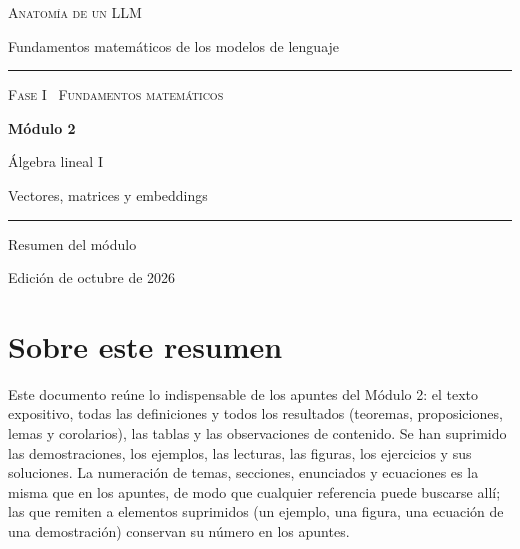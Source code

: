 \documentclass[11pt,a4paper,twoside,openany]{book}
\begin{document}
\frontmatter
\begin{titlepage}
\centering
\vspace*{2.5cm}
{\large\scshape Anatomía de un LLM}\par
\vspace{0.4cm}
{\normalsize Fundamentos matemáticos de los modelos de lenguaje}\par
\vspace{2.2cm}
\rule{\textwidth}{0.8pt}\par\vspace{0.5cm}
{\small\scshape Fase I \textperiodcentered\ Fundamentos matemáticos}\par\vspace{0.3cm}
{\Huge\bfseries Módulo 2\par}\vspace{0.3cm}
{\LARGE Álgebra lineal I\par}
\vspace{0.2cm}
{\large Vectores, matrices y embeddings\par}
\vspace{0.5cm}\rule{\textwidth}{0.4pt}\par
\vspace{1.6cm}
{\large Resumen del módulo}\par
\vfill
{\small Edición de octubre de 2026}\par
\end{titlepage}

\chapter*{Sobre este resumen}

Este documento reúne lo indispensable de los apuntes del Módulo 2: el texto expositivo, todas las definiciones y todos los resultados (teoremas, proposiciones, lemas y corolarios), las tablas y las observaciones de contenido. Se han suprimido las demostraciones, los ejemplos, las lecturas, las figuras, los ejercicios y sus soluciones. La numeración de temas, secciones, enunciados y ecuaciones es la misma que en los apuntes, de modo que cualquier referencia puede buscarse allí; las que remiten a elementos suprimidos (un ejemplo, una figura, una ecuación de una demostración) conservan su número en los apuntes.
\end{document}
